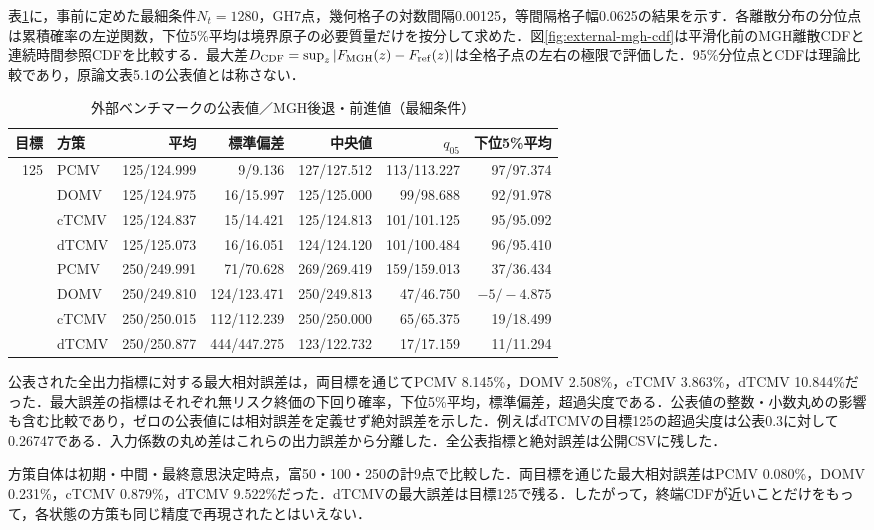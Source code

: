 \documentclass[10pt,a4paper]{article}
\theoremstyle{plain}
\theoremstyle{definition}
\begin{document}
表\ref{tab:vanstaden-all-mv-validation}に，事前に定めた最細条件$N_t=1280$，GH7点，幾何格子の対数間隔0.00125，等間隔格子幅0.0625の結果を示す．各離散分布の分位点は累積確率の左逆関数，下位5\%平均は境界原子の必要質量だけを按分して求めた．図\ref{fig:external-mgh-cdf}は平滑化前のMGH離散CDFと連続時間参照CDFを比較する．最大差$D_{\rm CDF}=\sup_z|F_{\rm MGH}(z)-F_{\rm ref}(z)|$は全格子点の左右の極限で評価した．95\%分位点とCDFは理論比較であり，原論文表5.1の公表値とは称さない．

\begin{table}[htbp]
\centering
\caption{外部ベンチマークの公表値／MGH後退・前進値（最細条件）}
\label{tab:vanstaden-all-mv-validation}
\scriptsize
\setlength{\tabcolsep}{3.2pt}
\begin{tabular}{@{}rlrrrrr@{}}
\toprule
目標 & 方策 & 平均 & 標準偏差 & 中央値 & $q_{05}$ & 下位5\%平均 \\
\midrule
125 & PCMV & 125/124.999 & 9/9.136 & 127/127.512 & 113/113.227 & 97/97.374 \\
 & DOMV & 125/124.975 & 16/15.997 & 125/125.000 & 99/98.688 & 92/91.978 \\
 & cTCMV & 125/124.837 & 15/14.421 & 125/124.813 & 101/101.125 & 95/95.092 \\
 & dTCMV & 125/125.073 & 16/16.051 & 124/124.120 & 101/100.484 & 96/95.410 \\
\addlinespace
250 & PCMV & 250/249.991 & 71/70.628 & 269/269.419 & 159/159.013 & 37/36.434 \\
 & DOMV & 250/249.810 & 124/123.471 & 250/249.813 & 47/46.750 & $-5/-4.875$ \\
 & cTCMV & 250/250.015 & 112/112.239 & 250/250.000 & 65/65.375 & 19/18.499 \\
 & dTCMV & 250/250.877 & 444/447.275 & 123/122.732 & 17/17.159 & 11/11.294 \\
\bottomrule
\end{tabular}
\end{table}

公表された全出力指標に対する最大相対誤差は，両目標を通じてPCMV 8.145\%，DOMV 2.508\%，cTCMV 3.863\%，dTCMV 10.844\%だった．最大誤差の指標はそれぞれ無リスク終価の下回り確率，下位5\%平均，標準偏差，超過尖度である．公表値の整数・小数丸めの影響も含む比較であり，ゼロの公表値には相対誤差を定義せず絶対誤差を示した．例えばdTCMVの目標125の超過尖度は公表0.3に対して0.26747である．入力係数の丸め差はこれらの出力誤差から分離した．全公表指標と絶対誤差は公開CSVに残した．

方策自体は初期・中間・最終意思決定時点，富50・100・250の計9点で比較した．両目標を通じた最大相対誤差はPCMV 0.080\%，DOMV 0.231\%，cTCMV 0.879\%，dTCMV 9.522\%だった．dTCMVの最大誤差は目標125で残る．したがって，終端CDFが近いことだけをもって，各状態の方策も同じ精度で再現されたとはいえない．
\end{document}

